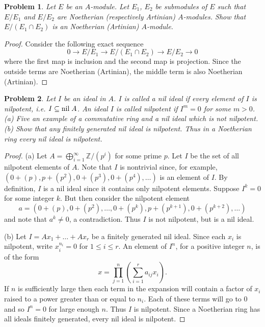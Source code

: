 \documentclass{article}
\newcommand{\nil}{\textup{nil}\;}
\newtheorem{problem}{Problem}
\begin{document}
\begin{problem}
Let $E$ be an $A$-module. Let $E_1$, $E_2$ be submodules of $E$ such that $E/E_1$ and $E/E_2$ are Noetherian (respectively Artinian) $A$-modules. Show that $E/(E_1 \cap E_2)$ is an Noetherian (Artinian) $A$-module.
\end{problem}
\begin{proof}
Consider the following exact sequence
\[
0 \to E/E_1 \to E/(E_1 \cap E_2) \to E/E_2 \to 0
\]
where the first map is inclusion and the second map is projection. Since the outside terms are Noetherian (Artinian), the middle term is also Noetherian (Artinian).
\end{proof}

\begin{problem}
Let $I$ be an ideal in $A$. $I$ is called a \emph{nil ideal} if every element of $I$ is nilpotent, i.e. $I \subseteq \nil A$. An ideal $I$ is called \emph{nilpotent} if $I^m = 0$ for some $m > 0$.\\
(a) Five an example of a commutative ring and a nil ideal which is not nilpotent.\\
(b) Show that any finitely generated nil ideal is nilpotent. Thus in a Noetherian ring every nil ideal is nilpotent.
\end{problem}
\begin{proof}
(a) Let $A = \bigoplus_{i=1}^{\infty} \mathbb{Z}/(p^i)$ for some prime $p$. Let $I$ be the set of all nilpotent elements of $A$. Note that $I$ is nontrivial since, for example, $(0 + (p), p + (p^2), 0 + (p^3), 0 + (p^4), \dots )$ is an element of $I$. By definition, $I$ is a nil ideal since it contains only nilpotent elements. Suppose $I^k = 0$ for some integer $k$. But then consider the nilpotent element
\[
a = (0 + (p), 0 + (p^2), \dots , 0 + (p^k), p + (p^{k+1}), 0 + (p^{k+2}), \dots )
\]
and note that $a^k \neq 0$, a contradiction. Thus $I$ is not nilpotent, but is a nil ideal.

(b) Let $I = Ax_1 + \dots + Ax_r$ be a finitely generated nil ideal. Since each $x_i$ is nilpotent, write $x_i^{n_i} = 0$ for $1 \leq i \leq r$. An element of $I^n$, for a positive integer $n$, is of the form
\[
x = \prod_{j=1}^n \left (\sum_{i=1}^r a_{ij} x_i \right ).
\]
If $n$ is sufficiently large then each term in the expansion will contain a factor of $x_i$ raised to a power greater than or equal to $n_i$. Each of these terms will go to $0$ and so $I^n = 0$ for large enough $n$. Thus $I$ is nilpotent. Since a Noetherian ring has all ideals finitely generated, every nil ideal is nilpotent.
\end{proof}
\end{document}
